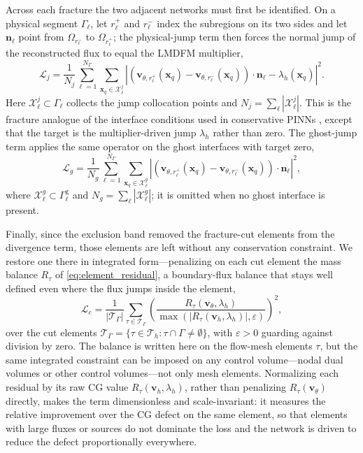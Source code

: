 \documentclass[a4paper,fleqn]{cas-sc}
\newcommand{\vflux}{\mathbf{v}}
\begin{document}
Across each fracture the two adjacent networks must first be identified. On a
physical segment \(\Gamma_\ell\), let \(r_\ell^+\) and \(r_\ell^-\) index the
subregions on its two sides and let \(\mathbf{n}_\ell\) point from
\(\Omega_{r_\ell^-}\) to \(\Omega_{r_\ell^+}\); the physical-jump term then forces
the normal jump of the reconstructed flux to equal the LMDFM multiplier,
\begin{equation}
\mathcal{L}_j
=
\frac{1}{N_j}
\sum_{\ell=1}^{N_\Gamma}
\sum_{\mathbf{x}_q\in\mathcal{X}_\ell^j}
\left|
\left(
\vflux_{\theta,r_\ell^+}(\mathbf{x}_q)
-
\vflux_{\theta,r_\ell^-}(\mathbf{x}_q)
\right)\cdot\mathbf{n}_\ell
-
\lambda_h(\mathbf{x}_q)
\right|^2 .
\label{eq:pinn_jump_loss}
\end{equation}
Here \(\mathcal{X}_\ell^j\subset\Gamma_\ell\) collects the jump collocation points
and \(N_j=\sum_\ell|\mathcal{X}_\ell^j|\). This is the fracture analogue of the
interface conditions used in conservative PINNs \citep{Jagtap2020}, except that the target is the
multiplier-driven jump \(\lambda_h\) rather than zero. The ghost-jump term applies
the same operator on the ghost interfaces with target zero,
\begin{equation}
\mathcal{L}_g
=
\frac{1}{N_g}
\sum_{\ell=1}^{N_\Gamma}
\sum_{\mathbf{x}_q\in\mathcal{X}_\ell^g}
\left|
\left(
\vflux_{\theta,r_\ell^+}(\mathbf{x}_q)
-
\vflux_{\theta,r_\ell^-}(\mathbf{x}_q)
\right)\cdot\mathbf{n}_\ell
\right|^2 ,
\label{eq:pinn_ghost_loss}
\end{equation}
where \(\mathcal{X}_\ell^g\subset\Gamma_\ell^{\mathrm{g}}\) and
\(N_g=\sum_\ell|\mathcal{X}_\ell^g|\); it is omitted when no ghost interface is
present.

Finally, since the exclusion band removed the fracture-cut elements from the
divergence term, those elements are left without any conservation constraint. We
restore one there in integrated form---penalizing on each cut element the mass
balance \(R_\tau\) of \eqref{eq:element_residual}, a boundary-flux balance that
stays well defined even where the flux jumps inside the element,
\begin{equation}
\mathcal{L}_c
=
\frac{1}{|\mathcal{T}_\Gamma|}
\sum_{\tau\in\mathcal{T}_\Gamma}
\left(
\frac{R_\tau(\vflux_\theta,\lambda_h)}
{\max(|R_\tau(\vflux_h,\lambda_h)|,\varepsilon)}
\right)^2,
\label{eq:pinn_element_loss}
\end{equation}
over the cut elements
\(\mathcal{T}_\Gamma=\{\tau\in\mathcal{T}_h:\tau\cap\Gamma\ne\emptyset\}\), with
\(\varepsilon>0\) guarding against division by zero. The balance is written here on
the flow-mesh elements \(\tau\), but the same integrated constraint can be imposed
on any control volume---nodal dual volumes or other control volumes---not only
mesh elements. Normalizing each residual by its raw CG value
\(R_\tau(\vflux_h,\lambda_h)\), rather than penalizing \(R_\tau(\vflux_\theta)\)
directly, makes the term dimensionless and scale-invariant: it measures the
relative improvement over the CG defect on the same element, so that elements with
large fluxes or sources do not dominate the loss and the network is driven to
reduce the defect proportionally everywhere.
\end{document}
